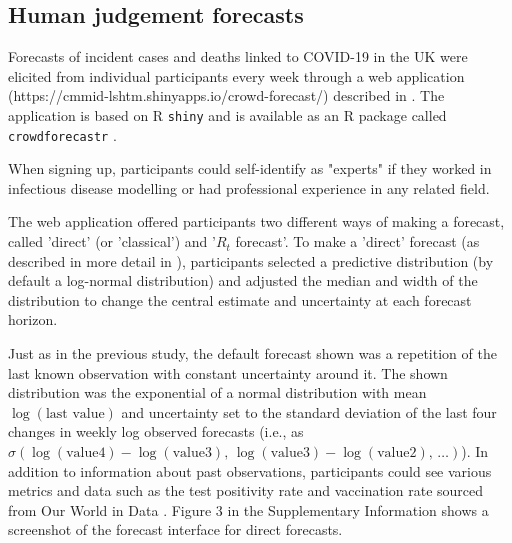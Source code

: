 \documentclass[10pt,a4paper,twocolumn]{article}
\begin{document}
\subsection*{Human judgement forecasts}

Forecasts of incident cases and deaths linked to COVID-19 in the UK were elicited from individual participants every week through a web application (https://cmmid-lshtm.shinyapps.io/crowd-forecast/) described in \cite{bosseComparingHumanModelbased2022}. The application is based on \textsf{R} \cite{R} \texttt{shiny} \cite{shiny} and is available as an \textsf{R} package called \texttt{crowdforecastr} \citep{crowdforecastr}. 

When signing up, participants could self-identify as "experts" if they worked in infectious disease modelling or had professional experience in any related field. 

The web application offered participants two different ways of making a forecast, called 'direct' (or 'classical') and '$R_t$ forecast'. To make a 'direct' forecast (as described in more detail in \cite{bosseComparingHumanModelbased2022}), participants selected a predictive distribution (by default a log-normal distribution) and adjusted the median and width of the distribution to change the central estimate and uncertainty at each forecast horizon. 

Just as in the previous study, the default forecast shown was a repetition of the last known observation with constant uncertainty around it. The shown distribution was the exponential of a normal distribution with mean $\log (\text{last value})$ and uncertainty set to the standard deviation of the last four changes in weekly log observed forecasts (i.e., as $\sigma(\log(\text{value4}) - \log(\text{value3}), \, \log(\text{value3}) - \log(\text{value2}), \, \dots)$).
In addition to information about past observations, participants could see various metrics and data such as the test positivity rate and vaccination rate sourced from Our World in Data \citep{owidcoronavirus}. Figure 3 in the Supplementary Information \cite{bosseSupplementaryInformationHuman2023} shows a screenshot of the forecast interface for direct forecasts. 
\end{document}
